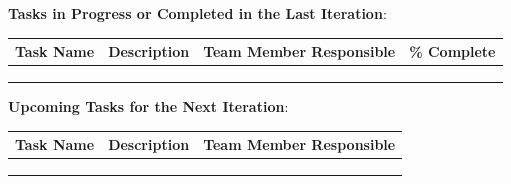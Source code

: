 \documentclass{article}
\begin{document}
    
\noindent \textbf{Tasks in Progress or Completed in the Last Iteration}: \\

\begin{center}
    \begin{table}[!ht]
    \centering
\begin{tabular}{|l|l|l|l|}
\hline
Task Name & Description & Team Member Responsible & \% Complete \\ \hline
             &               &             &             \\ \hline
             &               &             &                    \\ \hline
             &               &             &                    \\ \hline
\end{tabular}
\end{table}
\end{center}

\noindent \textbf{Upcoming Tasks for the Next Iteration}: \\

\begin{center}
    \begin{table}[!ht]
    \centering
\begin{tabular}{|l|l|l|}
\hline
Task Name & Description & Team Member Responsible  \\ \hline
             &               &                   \\ \hline
             &               &                   \\ \hline
             &               &                    \\ \hline
\end{tabular}
\end{table}
\end{center}
\end{document}
